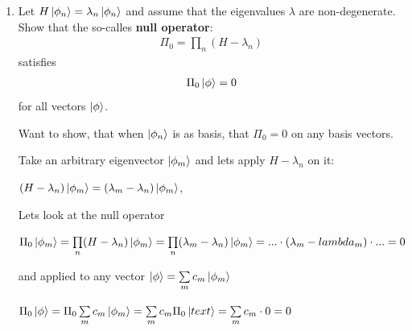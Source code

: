 \documentclass[11pt,a4paper]{scrartcl}
\newcommand{\norm}[1]{\left\lVert #1 \right\rVert}
\begin{document}
\begin{enumerate}
\begin{calculationbox}
\begin{calculationbox}
                $\ket{\hat{\phi}} \bra{\hat{X}}
                = \frac{1}{\norm{\phi}\norm{X}} \ket{\phi} \bra{X}
                $

                $P_1 P_2 = \frac{\braket{\hat{\phi} | \hat{X}}}{\norm{\phi} \norm{X}} \ket{\phi} \bra{X}$
            \end{calculationbox}
            With this $K = \ket{\phi} \bra{X} 
            = \frac{\norm{\phi} \norm{X}}{\braket{\hat{\phi} | \hat{X}}} P_1 P_2
            = \frac{\norm{\phi}^2 \norm{X}^2}{\braket{\phi | X}} P_1 P_2
            = \alpha P_1 P_2$
        \end{calculationbox}

        \item Let $H \ket{\phi_n} = \lambda_n \ket{\phi_n}$ and assume that the eigenvalues $\lambda$  are non-degenerate. Show that the so-calles \textbf{null operator}: 
        \begin{align*}
            \Pi_0 = \prod\limits_n (H - \lambda_n)
        \end{align*}
        satisfies
        \begin{align*}
            \Pi_0 \ket{\phi} = 0
        \end{align*}
        for all vectors $\ket{\phi}$.

        \begin{calculationbox}
            Want to show, that when $\ket{\phi_n}$ is as basis, that $\Pi_0 = 0$ on any basis vectors. 
            \begin{calculationbox}
                Take an arbitrary eigenvector $\ket{\phi_m}$ and lets apply $H-\lambda_n$ on it:

                $(H - \lambda_n) \ket{\phi_m} = (\lambda_m - \lambda_n)\ket{\phi_m}$,
            \end{calculationbox}
            
            Lets look at the null operator
            \begin{calculationbox}
                $\Pi_0\ket{\phi_m} 
                = \prod\limits_n (H - \lambda_n) \ket{\phi_m}
                = \prod\limits_n (\lambda_m - \lambda_n) \ket{\phi_m}
                = ... \cdot (\lambda_m - lambda_m) \cdot ...
                = 0$
            \end{calculationbox}
            and applied to any vector $\ket{\phi} = \sum\limits_m c_m \ket{\phi_m}$
            \begin{calculationbox}
                $\Pi_0 \ket{\phi}
                = \Pi_0 \sum\limits_m c_m \ket{\phi_m}
                = \sum\limits_m c_m \Pi_0 \ket{text}
                =\sum\limits_m c_m \cdot 0
                = 0
                $
            \end{calculationbox}


\end{calculationbox}
\end{enumerate}
\end{document}
